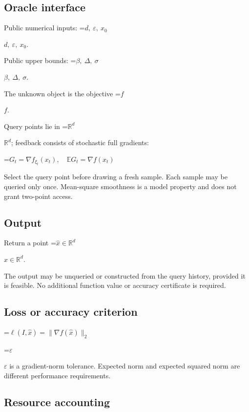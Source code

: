 \documentclass[10pt,a4paper]{article}
\newcommand{\AtlasMath}[1]{\par\begingroup\centering\setbox0=\hbox{$\displaystyle #1$}\ifdim\wd0>1.4\linewidth\typeout{ATLAS WIDE FORMULA: \the\wd0}\fi\ifdim\wd0>\linewidth\resizebox{\linewidth}{!}{\box0}\else\box0\fi\par\endgroup}
\newcommand{\AtlasInlineMath}[1]{\begingroup\setbox0=\hbox{$#1$}\ifdim\wd0>.4\linewidth\endgroup\AtlasMath{#1}\else\endgroup$#1$\fi}
\begin{document}
\subsection{Oracle interface}


Public numerical inputs: \AtlasInlineMath{d,\ \varepsilon,\ x_0}.



Public upper bounds: \AtlasInlineMath{\beta,\ \Delta,\ \sigma}.



The unknown object is the objective \AtlasInlineMath{f}.



Query points lie in \AtlasInlineMath{\mathbb{R}^d}; feedback consists of stochastic full gradients:




\AtlasMath{G_t=\nabla f_{\xi_t}(x_t),\quad\mathbb{E} G_t=\nabla f(x_t)}




Select the query point before drawing a fresh sample. Each sample may be queried only once. Mean-square smoothness is a model property and does not grant two-point access.



\subsection{Output}


Return a point \AtlasInlineMath{\widehat x\in\mathbb R^d}.



The output may be unqueried or constructed from the query history, provided it is feasible. No additional function value or accuracy certificate is required.



\subsection{Loss or accuracy criterion}



\AtlasMath{\ell(I,\widehat{x})=\|\nabla f(\widehat{x})\|_2}




\AtlasInlineMath{\varepsilon} is a gradient-norm tolerance. Expected norm and expected squared norm are different performance requirements.



\subsection{Resource accounting}
\end{document}
